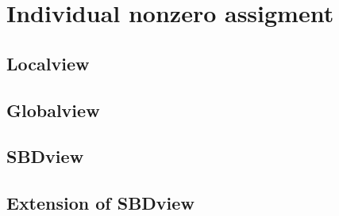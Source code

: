 \chapter{Individual nonzero assigment}
\section{Localview}
\section{Globalview}
\section{SBDview}
\section{Extension of SBDview}